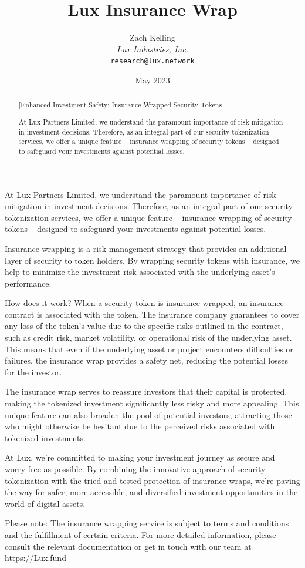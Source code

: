 \documentclass[11pt]{article}
\title{Lux Insurance Wrap}
\author{Zach Kelling\\\textit{Lux Industries, Inc.}\\\texttt{research@lux.network}}
\date{May 2023}
\begin{document}
\luxcoverpage

\begin{abstract}
[Enhanced Investment Safety: Insurance-Wrapped Security Tokens

At Lux Partners Limited, we understand the paramount importance of risk mitigation in investment decisions. Therefore, as an integral part of our security tokenization services, we offer a unique feature -- insurance wrapping of security tokens -- designed to safeguard your investments against potential losses.
\end{abstract}

\tableofcontents
\newpage


At Lux Partners Limited, we understand the paramount importance of risk mitigation in investment decisions. Therefore, as an integral part of our security tokenization services, we offer a unique feature -- insurance wrapping of security tokens -- designed to safeguard your investments against potential losses.


Insurance wrapping is a risk management strategy that provides an additional layer of security to token holders. By wrapping security tokens with insurance, we help to minimize the investment risk associated with the underlying asset's performance.


How does it work? When a security token is insurance-wrapped, an insurance contract is associated with the token. The insurance company guarantees to cover any loss of the token's value due to the specific risks outlined in the contract, such as credit risk, market volatility, or operational risk of the underlying asset. This means that even if the underlying asset or project encounters difficulties or failures, the insurance wrap provides a safety net, reducing the potential losses for the investor.


The insurance wrap serves to reassure investors that their capital is protected, making the tokenized investment significantly less risky and more appealing. This unique feature can also broaden the pool of potential investors, attracting those who might otherwise be hesitant due to the perceived risks associated with tokenized investments.


At Lux, we're committed to making your investment journey as secure and worry-free as possible. By combining the innovative approach of security tokenization with the tried-and-tested protection of insurance wraps, we're paving the way for safer, more accessible, and diversified investment opportunities in the world of digital assets.


Please note: The insurance wrapping service is subject to terms and conditions and the fulfillment of certain criteria. For more detailed information, please consult the relevant documentation or get in touch with our team at https://Lux.fund
\end{document}
